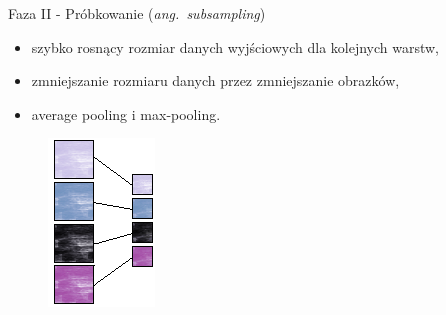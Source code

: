 \documentclass[xcolor=dvipsnames]{beamer}
\begin{document}
\begin{frame}{Faza II - Próbkowanie (\textit{ang.~subsampling})}
	\begin{minipage}[t]{0.6\linewidth}
		\begin{itemize}
			\item szybko rosnący rozmiar danych wyjściowych dla kolejnych warstw,
			\item zmniejszanie rozmiaru danych przez zmniejszanie obrazków,
			\item average pooling i max-pooling.
		\end{itemize}
	\end{minipage}%
	\hfill
	\begin{minipage}[t]{0.3\linewidth}
		\vfill
		\begin{figure}
			\includegraphics[width=\linewidth, height=0.7\textheight, keepaspectratio] {img/pooling.png}
		\end{figure}
	\end{minipage}
\end{frame}
\end{document}

